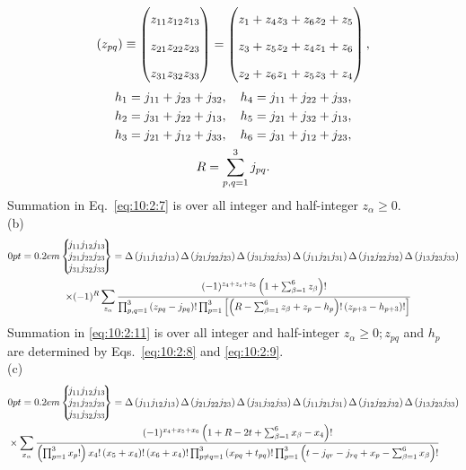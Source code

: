 \begin{gather}
\left(z_{p q}\right) \equiv\left(\begin{array}{lll}
z_{11} & z_{12} & z_{13} \\
z_{21} & z_{22} & z_{23} \\
z_{31} & z_{32} & z_{33}
\end{array}\right)=\left(\begin{array}{lll}
z_{1}+z_{4} & z_{3}+z_{6} & z_{2}+z_{5} \\
z_{3}+z_{5} & z_{2}+z_{4} & z_{1}+z_{6} \\
z_{2}+z_{6} & z_{1}+z_{5} & z_{3}+z_{4}
\end{array}\right),  \label{eq:10:2:8}\\
h_{1}=j_{11}+j_{23}+j_{32}, \quad h_{4}=j_{11}+j_{22}+j_{33},  \notag\\
h_{2}=j_{31}+j_{22}+j_{13}, \quad h_{5}=j_{21}+j_{32}+j_{13},  \label{eq:10:2:9}\\
h_{3}=j_{21}+j_{12}+j_{33}, \quad h_{6}=j_{31}+j_{12}+j_{23},  \notag\\
R=\sum_{p, q=1}^{3} j_{p q}. \label{eq:10:2:10}
\end{gather}
Summation in Eq.~\eqref{eq:10:2:7} is over all integer and half-integer $z_{\alpha} \geq 0$.\\
(b)
\begin{gather}
\ninej{j_{11}}{j_{12}}{j_{13}}{j_{21}}{j_{22}}{j_{23}}{j_{31}}{j_{32}}{j_{33}}=\Delta\left(j_{11} j_{12} j_{13}\right) \Delta\left(j_{21} j_{22} j_{23}\right) \Delta\left(j_{31} j_{32} j_{33}\right) \Delta\left(j_{11} j_{21} j_{31}\right) \Delta\left(j_{12} j_{22} j_{32}\right) \Delta\left(j_{13} j_{23} j_{33}\right)  \notag\\
\quad \times(-1)^{R} \sum_{z_{\alpha}} \frac{(-1)^{z_{4}+z_{s}+z_{6}}\left(1+\sum_{\beta=1}^{6} z_{\beta}\right)!}{\prod_{p, q=1}^{3}\left(z_{p q}-j_{p q}\right)!\prod_{p=1}^{3}\left[\left(R-\sum_{\beta=1}^{6} z_{\beta}+z_{p}-h_{p}\right)!\left(z_{p+3}-h_{p+3}\right)!\right]} \label{eq:10:2:11}
\end{gather}
Summation in \eqref{eq:10:2:11} is over all integer and half-integer $z_{\alpha} \geq 0 ; z_{p q}$ and $h_{p}$ are determined by Eqs.~\eqref{eq:10:2:8} and \eqref{eq:10:2:9}.\\
(c)
\begin{align}
& \ninej{j_{11}}{j_{12}}{j_{13}}{j_{21}}{j_{22}}{j_{23}}{j_{31}}{j_{32}}{j_{33}}=\Delta\left(j_{11} j_{12} j_{13}\right) \Delta\left(j_{21} j_{22} j_{23}\right) \Delta\left(j_{31} j_{32} j_{33}\right) \Delta\left(j_{11} j_{21} j_{31}\right) \Delta\left(j_{12} j_{22} j_{32}\right) \Delta\left(j_{13} j_{23} j_{33}\right)  \notag\\
& \times \sum_{x_{\alpha}} \frac{(-1)^{x_{4}+x_{5}+x_{6}}\left(1+R-2 t+\sum_{\beta=1}^{6} x_{\beta}-x_{4}\right)!}{\left(\prod_{p=1}^{3} x_{p}!\right) x_{4}!\left(x_{5}+x_{4}\right)!\left(x_{6}+x_{4}\right)!\prod_{p \neq q=1}^{3}\left(x_{p q}+t_{p q}\right)!\prod_{p=1}^{3}\left(t-j_{q r}-j_{r q}+x_{p}-\sum_{\beta=1}^{6} x_{\beta}\right)!} \label{eq:10:2:12}
\end{align}
